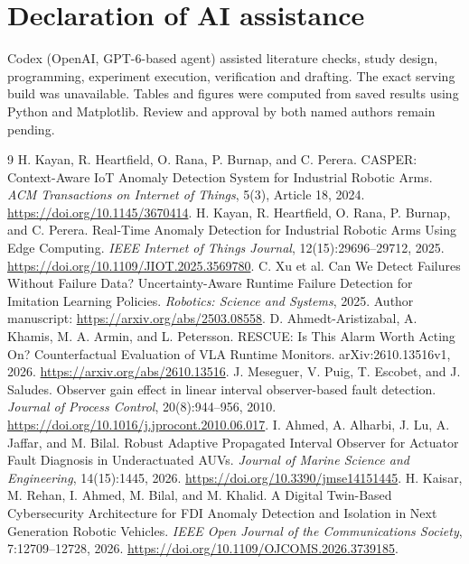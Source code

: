 \documentclass[11pt]{article}
\begin{document}
\section*{Declaration of AI assistance}
Codex (OpenAI, GPT-6-based agent) assisted literature checks, study design, programming, experiment execution, verification and drafting. The exact serving build was unavailable. Tables and figures were computed from saved results using Python and Matplotlib. Review and approval by both named authors remain pending.

\begingroup{}
\begin{thebibliography}{9}
 H. Kayan, R. Heartfield, O. Rana, P. Burnap, and C. Perera. CASPER: Context-Aware IoT Anomaly Detection System for Industrial Robotic Arms. \emph{ACM Transactions on Internet of Things}, 5(3), Article 18, 2024. \url{https://doi.org/10.1145/3670414}.
 H. Kayan, R. Heartfield, O. Rana, P. Burnap, and C. Perera. Real-Time Anomaly Detection for Industrial Robotic Arms Using Edge Computing. \emph{IEEE Internet of Things Journal}, 12(15):29696--29712, 2025. \url{https://doi.org/10.1109/JIOT.2025.3569780}.
 C. Xu et al. Can We Detect Failures Without Failure Data? Uncertainty-Aware Runtime Failure Detection for Imitation Learning Policies. \emph{Robotics: Science and Systems}, 2025. Author manuscript: \url{https://arxiv.org/abs/2503.08558}.
 D. Ahmedt-Aristizabal, A. Khamis, M. A. Armin, and L. Petersson. RESCUE: Is This Alarm Worth Acting On? Counterfactual Evaluation of VLA Runtime Monitors. arXiv:2610.13516v1, 2026. \url{https://arxiv.org/abs/2610.13516}.
 J. Meseguer, V. Puig, T. Escobet, and J. Saludes. Observer gain effect in linear interval observer-based fault detection. \emph{Journal of Process Control}, 20(8):944--956, 2010. \url{https://doi.org/10.1016/j.jprocont.2010.06.017}.
 I. Ahmed, A. Alharbi, J. Lu, A. Jaffar, and M. Bilal. Robust Adaptive Propagated Interval Observer for Actuator Fault Diagnosis in Underactuated AUVs. \emph{Journal of Marine Science and Engineering}, 14(15):1445, 2026. \url{https://doi.org/10.3390/jmse14151445}.
 H. Kaisar, M. Rehan, I. Ahmed, M. Bilal, and M. Khalid. A Digital Twin-Based Cybersecurity Architecture for FDI Anomaly Detection and Isolation in Next Generation Robotic Vehicles. \emph{IEEE Open Journal of the Communications Society}, 7:12709--12728, 2026. \url{https://doi.org/10.1109/OJCOMS.2026.3739185}.
\end{thebibliography}\endgroup
\end{document}
